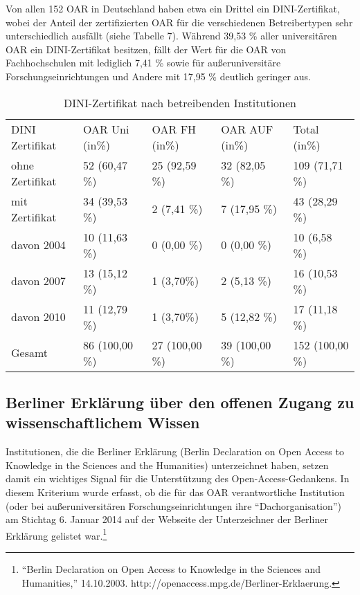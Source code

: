 \documentclass[a4paper,
fontsize=11pt,
oneside,
numbers=noperiodatend,
parskip=half-,
bibliography=totoc,
final
]{scrartcl}
\begin{document}
Von allen 152 OAR in Deutschland haben etwa ein Drittel ein
DINI-Zertifikat, wobei der Anteil der zertifizierten OAR für die
verschiedenen Betreibertypen sehr unterschiedlich ausfällt (siehe
Tabelle 7). Während 39,53 \% aller universitären OAR ein DINI-Zertifikat
besitzen, fällt der Wert für die OAR von Fachhochschulen mit lediglich
7,41 \% sowie für außeruniversitäre Forschungseinrichtungen und Andere
mit 17,95 \% deutlich geringer aus.

\begin{table}[ht]
\centering
\begin{tabular}{lllll}
  \toprule
DINI Zertifikat & OAR Uni (in\%)   & OAR FH (in\%)  & OAR AUF (in\%)  & Total (in\%) \\  
\cmidrule(r){1-1} \cmidrule(r){2-2} \cmidrule(r){3-3} \cmidrule(r){4-4} \cmidrule(r){5-5}
ohne Zertifikat & 52 (60,47 \%) & 25 (92,59 \%) & 32 (82,05 \%) & 109 (71,71 \%)  \\ 
  mit Zertifikat & 34 (39,53 \%) & 2 (7,41 \%) & 7 (17,95 \%) & 43 (28,29 \%) \\ 
  davon 2004 & 10 (11,63 \%) & 0 (0,00 \%) & 0 (0,00 \%) & 10 (6,58 \%) \\ 
  davon 2007 & 13 (15,12 \%) & 1 (3,70\%) & 2 (5,13 \%) & 16 (10,53 \%) \\ 
  davon 2010 & 11 (12,79 \%) & 1 (3,70\%) & 5 (12,82 \%) & 17 (11,18 \%) \\ 
  \cmidrule(r){1-1} \cmidrule(r){2-2} \cmidrule(r){3-3} \cmidrule(r){4-4} \cmidrule(r){5-5}
  Gesamt & 86 (100,00 \%) & 27 (100,00 \%) & 39 (100,00 \%) & 152 (100,00 \%) \\ 
\bottomrule
\end{tabular}
\caption{DINI-Zertifikat nach betreibenden Institutionen}
\end{table}

\subsection*{Berliner Erklärung über den offenen Zugang zu
wissenschaftlichem
Wissen}\label{berliner-erkluxe4rung-uxfcber-den-offenen-zugang-zu-wissenschaftlichem-wissen}

Institutionen, die die Berliner Erklärung (Berlin Declaration on Open
Access to Knowledge in the Sciences and the Humanities) unterzeichnet
haben, setzen damit ein wichtiges Signal für die Unterstützung des
Open-Access-Gedankens. In diesem Kriterium wurde erfasst, ob die für das
OAR verantwortliche Institution (oder bei außeruniversitären
Forschungseinrichtungen ihre \enquote{Dachorganisation}) am Stichtag 6.
Januar 2014 auf der Webseite der Unterzeichner der Berliner Erklärung
gelistet war.\footnote{\enquote{Berlin Declaration on Open Access to
  Knowledge in the Sciences and Humanities,} 14.10.2003.
  http://openaccess.mpg.de/Berliner-Erklaerung.}
\end{document}

